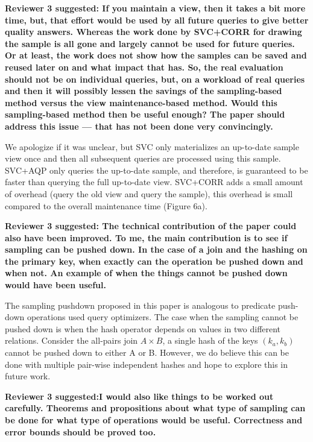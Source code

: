 \vspace{1.5em}

\textbf{Reviewer 3 suggested:  If you maintain a view, then it takes a bit more time, but, that effort would be used by all future queries to give better quality answers. Whereas the work done by SVC+CORR for drawing the sample is all gone and largely cannot be used for future queries. Or at least, the work does not show how the samples can be saved and reused later on and what impact that has. So, the real evaluation should not be on individual queries, but, on a workload of real queries and then it will possibly lessen the savings of the sampling-based method versus the view maintenance-based method. Would this sampling-based method then be useful enough? The paper should address this issue --- that has not been done very convincingly.}

We apologize if it was unclear, but SVC only materializes an up-to-date sample view once and then all subsequent queries are processed using this sample. SVC+AQP only queries the up-to-date sample, and therefore, is guaranteed to be faster than querying the full up-to-date view. SVC+CORR adds a small amount of overhead (query the old view and query the sample), this overhead is small compared to the overall maintenance time (Figure 6a).

\vspace{1.5em}

\textbf{Reviewer 3 suggested: The technical contribution of the paper could also have been improved. To me, the main contribution is to see if sampling can be pushed down. In the case of a join and the hashing on the primary key, when exactly can the operation be pushed down and when not. An example of when the things cannot be pushed down would have been useful. }

The sampling pushdown proposed in this paper is analogous to predicate push-down operations used query optimizers. The case when the sampling cannot be pushed down
is when the hash operator depends on values in two different relations. Consider the all-pairs join $A \times B$, a single hash of the keys $(k_a, k_b)$ cannot be pushed down to either A or B. However, we do believe this can be done with multiple pair-wise independent hashes and hope to explore this in future work.

\vspace{1.5em}

\textbf{Reviewer 3 suggested:I would also like things to be worked out carefully. Theorems and propositions about what type of sampling can be done for what type of operations would be useful. Correctness and error bounds should be proved too.}

